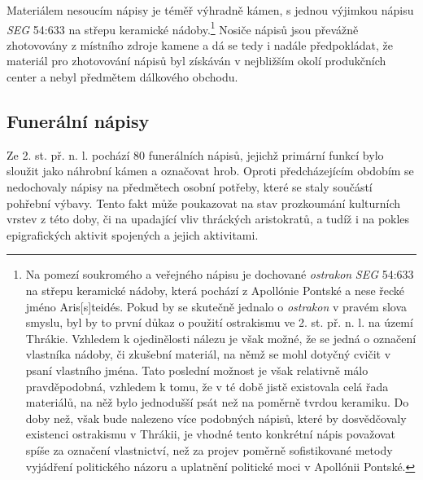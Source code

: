 Materiálem nesoucím nápisy je téměř výhradně kámen, s jednou výjimkou nápisu {\em SEG} 54:633 na střepu keramické nádoby.\footnote{Na pomezí soukromého a veřejného nápisu je dochované {\em ostrakon} {\em SEG} 54:633 na střepu keramické nádoby, která pochází z Apollónie Pontské a nese řecké jméno Aris{[}s{]}teidés. Pokud by se skutečně jednalo o {\em ostrakon} v pravém slova smyslu, byl by to první důkaz o použití ostrakismu ve 2. st. př. n. l. na území Thrákie. Vzhledem k ojedinělosti nálezu je však možné, že se jedná o označení vlastníka nádoby, či zkušební materiál, na němž se mohl dotyčný cvičit v psaní vlastního jména. Tato poslední možnost je však relativně málo pravděpodobná, vzhledem k tomu, že v té době jistě existovala celá řada materiálů, na něž bylo jednodušší psát než na poměrně tvrdou keramiku. Do doby než, však bude nalezeno více podobných nápisů, které by dosvědčovaly existenci ostrakismu v Thrákii, je vhodné tento konkrétní nápis považovat spíše za označení vlastnictví, než za projev poměrně sofistikované metody vyjádření politického názoru a uplatnění politické moci v Apollónii Pontské.} Nosiče nápisů jsou převážně zhotovovány z místního zdroje kamene a dá se tedy i nadále předpokládat, že materiál pro zhotovování nápisů byl získáván v nejbližším okolí produkčních center a nebyl předmětem dálkového obchodu.

\subsection[funerální-nápisy-7]{Funerální nápisy}

Ze 2. st. př. n. l. pochází 80 funerálních nápisů, jejichž primární funkcí bylo sloužit jako náhrobní kámen a označovat hrob. Oproti předcházejícím obdobím se nedochovaly nápisy na předmětech osobní potřeby, které se staly součástí pohřební výbavy. Tento fakt může poukazovat na stav prozkoumání kulturních vrstev z této doby, či na upadající vliv thráckých aristokratů, a tudíž i na pokles epigrafických aktivit spojených a jejich aktivitami.

